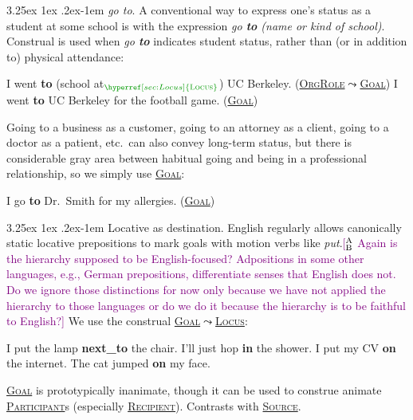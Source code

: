 \documentclass[11pt,letterpaper]{article}
\makeatletter
\renewcommand{\paragraph}{%
  \@startsection{paragraph}{4}%
  {\z@}{3.25ex \@plus 1ex \@minus .2ex}{-1em}%
  {\normalfont\normalsize\bfseries}%
}
\newcommand{\ensuretext}[1]{#1}
\newcommand{\abmarker}{\ensuretext{\textcolor{purple}{\ensuremath{^{\textsc{A}}_{\textsc{B}}}}}}
\newcommand{\arkcomment}[3]{\ensuretext{\textcolor{#3}{[#1 #2]}}}
\newcommand{\ab}[1]{\arkcomment{\abmarker}{#1}{purple}}
\newcommand{\p}[1]{\textbf{\textsf{#1}}} %
\newcommand{\lbl}[1]{\textsc{#1}} %
\newcommand{\sst}[1]{\lbl{#1}} %
\newcommand{\psst}[1]{\textcolor{mdgreen}{\hyperref[sec:#1]{\sst{#1}}}} %
\newcommand{\rf}[2]{\psst{#1}$\leadsto$\psst{#2}}
\newcommand{\pex}[1]{\textit{#1}} %
\makeatother
\begin{document}
\paragraph{\emph{go to}.} A conventional way to express one's status as a student at some school is 
with the expression \pex{go \p{to} (name or kind of school)}.
Construal is used when \pex{go \p{to}} indicates student status, rather than 
(or in addition to) physical attendance:
\begin{exe}
  \ex\label{ex:student} I went \p{to} (school at$_{\psst{Locus}}$) UC Berkeley. (\rf{OrgRole}{Goal})
   I went \p{to} UC Berkeley for the football game. (\psst{Goal})
\end{exe}
Going to a business as a customer, going to an attorney as a client, 
going to a doctor as a patient, etc.\ can also convey long-term status, 
but there is considerable gray area between habitual going and 
being in a professional relationship, so we simply use \psst{Goal}:
\begin{exe}
  \ex I go \p{to} Dr.~Smith for my allergies. (\psst{Goal})
\end{exe}

\paragraph{Locative as destination.}
English regularly allows canonically static locative prepositions to mark 
goals with motion verbs like \pex{put}.\ab{Again is the hierarchy supposed to be English-focused? Adpositions in some other languages, e.g., German prepositions, differentiate senses that English does not. Do we ignore those distinctions for now only because we have not applied the hierarchy to those languages or do we do it because the hierarchy is to be faithful to English?} 
We use the construal \rf{Goal}{Locus}:
\begin{exe}
  \ex I put the lamp \p{next\_to} the chair.
  \ex I'll just hop \p{in} the shower.
  \ex I put my CV \p{on} the internet.
  \ex The cat jumped \p{on} my face.
\end{exe}


\psst{Goal} is prototypically inanimate, though it can be used to construe animate \psst{Participant}s 
(especially \psst{Recipient}).
Contrasts with \psst{Source}.
\end{document}
